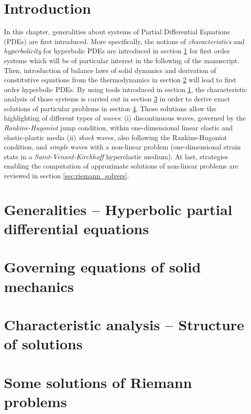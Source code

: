 \section*{Introduction}
In this chapter, generalities about systems of Partial Differential Equations (PDEs) are first introduced. More specifically, the notions of \textit{characteristics} and \textit{hyperbolicity} for hyperbolic PDEs are introduced in section \ref{sec:PDEs} for first order systems which will be of particular interest in the following of the manuscript.
Then, introduction of balance laws of solid dynamics and derivation of constitutive equations from the thermodynamics in section \ref{sec:solidMech_equations} will lead to first order hyperbolic PDEs.
By using tools introduced in section \ref{sec:PDEs}, the characteristic analysis of those systems is carried out in section \ref{sec:characteristic_analysis} in order to derive exact solutions of particular problems in section \ref{sec:riemann_problems}. Those solutions allow the highlighting of different types of \textit{waves}: (i) discontinuous waves, governed by the \textit{Rankine-Hugoniot} jump condition, within one-dimensional linear elastic and elastic-plastic media (ii) \textit{shock} waves, also following the Rankine-Hugoniot condition, and \textit{simple} waves with a non-linear problem (one-dimensional strain state in a \textit{Saint-Venant-Kirchhoff} hyperelastic medium).
At last, strategies enabling the computation of approximate solutions of non-linear problems are reviewed in section \ref{sec:riemann_solvers}.


\section{Generalities -- Hyperbolic partial differential equations}
\label{sec:PDEs}


\section{Governing equations of solid mechanics}
\label{sec:solidMech_equations}



\section{Characteristic analysis -- Structure of solutions}
\label{sec:characteristic_analysis}


\section{Some solutions of Riemann problems}
\label{sec:riemann_problems}


